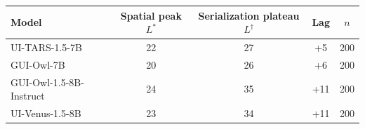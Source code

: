 \begin{tabular}{lcccc}
\toprule
Model & Spatial peak $L^*$ & Serialization plateau $L^\dagger$ & Lag & $n$ \\
\midrule
UI-TARS-1.5-7B & 22 & 27 & +5 & 200 \\
GUI-Owl-7B & 20 & 26 & +6 & 200 \\
GUI-Owl-1.5-8B-Instruct & 24 & 35 & +11 & 200 \\
UI-Venus-1.5-8B & 23 & 34 & +11 & 200 \\
\bottomrule
\end{tabular}
